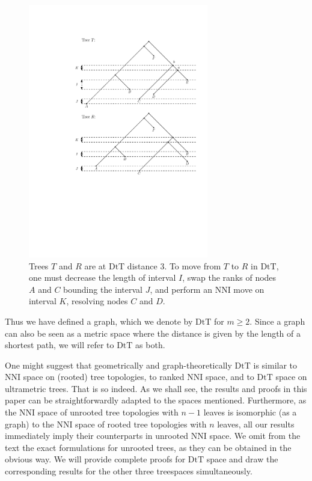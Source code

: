 \documentclass{amsart}
\newcommand{\mdts}{\mathrm{DtT}}
\begin{document}
\begin{figure}[h]
\centering
\includegraphics[width=0.7\textwidth]{dts_neighbours.pdf}
\caption{Trees $T$ and $R$ are at $\mdts$ distance $3$.
To move from $T$ to $R$ in $\mdts$, one must decrease the length of interval $I$, swap the ranks of nodes $A$ and $C$ bounding the interval $J$, and perform an NNI move on interval $K$, resolving nodes $C$ and $D$.}
\label{dts_neighbours.pdf}
\end{figure}

Thus we have defined a graph, which we denote by $\mdts$ for $m \geq 2$.
Since a graph can also be seen as a metric space where the distance is given by the length of a shortest path, we will refer to $\mdts$ as both.

One might suggest that geometrically and graph-theoretically $\mdts$ is similar to NNI space on (rooted) tree topologies, to ranked NNI space, and to $\mdts$ space on ultrametric trees.
That is so indeed.
As we shall see, the results and proofs in this paper can be straightforwardly adapted to the spaces mentioned.
Furthermore, as the NNI space of unrooted tree topologies with $n-1$ leaves is isomorphic (as a graph) to the NNI space of rooted tree topologies with $n$ leaves, all our results immediately imply their counterparts in unrooted NNI space.
We omit from the text the exact formulations for unrooted trees, as they can be obtained in the obvious way.
We will provide complete proofs for $\mdts$ space and draw the corresponding results for the other three treespaces simultaneously.
\end{document}
